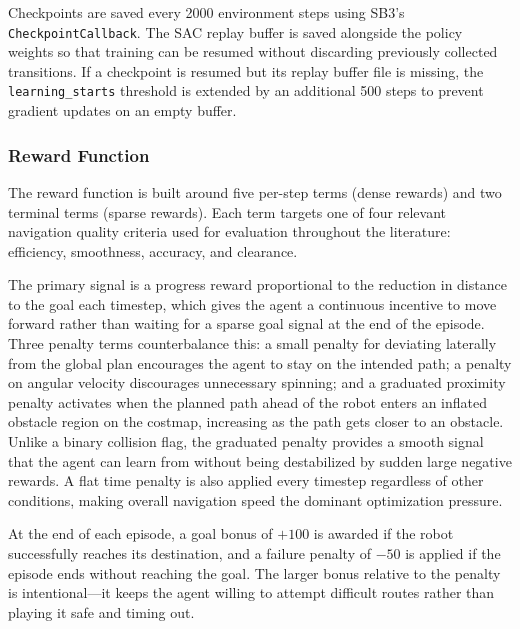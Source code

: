 \documentclass[conference]{IEEEtran}
\begin{document}
        Checkpoints are saved every 2000 environment steps using SB3's \texttt{CheckpointCallback}. The SAC replay buffer is saved
        alongside the policy weights so that training can be resumed without discarding previously collected transitions. If a checkpoint
        is resumed but its replay buffer file is missing, the \texttt{learning\_starts} threshold is extended by an additional 500 steps
        to prevent gradient updates on an empty buffer.

        \subsubsection{Reward Function}
        The reward function is built around five per-step terms (dense rewards) and two terminal terms (sparse rewards). Each term targets one of four relevant navigation
        quality criteria used for evaluation throughout the literature: efficiency, smoothness, accuracy, and clearance.

        The primary signal is a progress reward proportional to the reduction in distance to the goal each timestep, which gives the
        agent a continuous incentive to move forward rather than waiting for a sparse goal signal at the end of the episode. Three
        penalty terms counterbalance this: a small penalty for deviating laterally from the global plan encourages the agent to stay
        on the intended path; a penalty on angular velocity discourages unnecessary spinning; and a graduated proximity penalty
        activates when the planned path ahead of the robot enters an inflated obstacle region on the costmap, increasing as the path
        gets closer to an obstacle. Unlike a binary collision flag, the graduated penalty provides a smooth signal that the agent can
        learn from without being destabilized by sudden large negative rewards. A flat time penalty is also applied every timestep
        regardless of other conditions, making overall navigation speed the dominant optimization pressure.

        At the end of each episode, a goal bonus of $+100$ is awarded if the robot successfully reaches its destination, and a failure
        penalty of $-50$ is applied if the episode ends without reaching the goal. The larger bonus relative to the penalty is
        intentional---it keeps the agent willing to attempt difficult routes rather than playing it safe and timing out.
\end{document}
